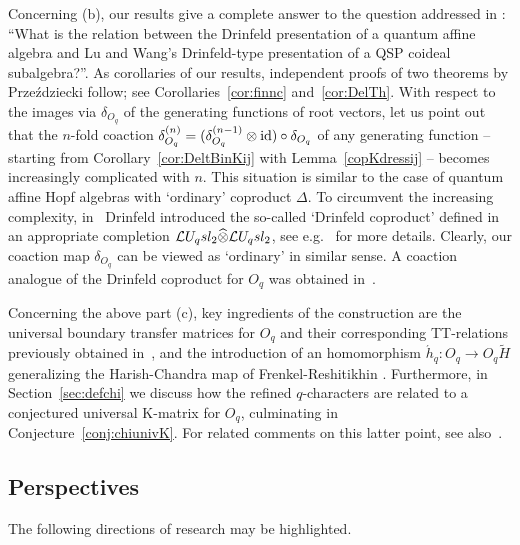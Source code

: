 \documentclass[11pt]{amsart}
\numberwithin{equation}{section}
\numberwithin{equation}{section}
\begin{document}
Concerning (b), our results give a complete answer  to the question addressed in \cite[Sec.\,1.5]{P24}: ``What is the relation between the Drinfeld presentation of a quantum affine algebra and Lu and Wang’s Drinfeld-type presentation of a QSP coideal subalgebra?''. As corollaries of our results, independent proofs of two theorems by Prze\'zdziecki follow; see Corollaries~\ref{cor:finnc} and~\ref{cor:DelTh}.
 With respect to the images via $\delta_{O_q}$ of the generating functions of root vectors, let us point out that  the $n$-fold coaction $\delta_{O_q}^{(n)} = (\delta_{O_q}^{(n-1)}\otimes \mathrm{id})\circ \delta_{O_q}$ of any generating function -- starting from Corollary~\ref{cor:DeltBinKij} with Lemma~\ref{copKdressij} -- becomes increasingly complicated with $n$. This situation is similar to the case of quantum affine Hopf algebras with `ordinary' coproduct $\Delta$. To circumvent the increasing complexity, in~\cite{Dr88} Drinfeld introduced the so-called `Drinfeld coproduct' defined in an appropriate
completion $\mathcal{L} U_q sl_2 \widehat{\otimes} \mathcal{L} U_q sl_2$, see e.g.~\cite{He06,Da24} for more details. Clearly, our coaction map $\delta_{O_q}$ can be viewed as `ordinary' in similar sense. 
A coaction analogue of the Drinfeld coproduct for $O_q$ was obtained in~\cite[Prop.\,4.15]{LP26}.

Concerning the above part (c), key ingredients of the construction are the universal boundary transfer matrices for $O_q$ and their corresponding TT-relations previously obtained in~\cite{L23,AV24b,BGL25}, and the introduction of an homomorphism $\acute{h}_q: O_q \rightarrow O_q\tilde{H}$ generalizing the Harish-Chandra map of Frenkel-Reshitikhin \cite{FR99}. Furthermore, in Section~\ref{sec:defchi} we discuss how  the refined $q$-characters are related to a conjectured universal K-matrix for $O_q$, culminating in Conjecture~\ref{conj:chiunivK}.  For related comments on this latter point, see also~\cite[Sec.\,1.6.1]{AV24b}.

\subsection{Perspectives} The following directions of research may be highlighted.
\end{document}
